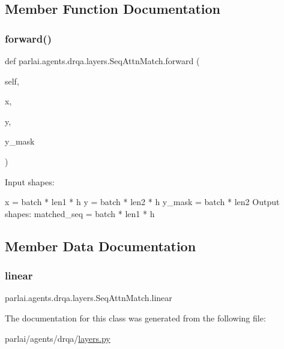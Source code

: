 \subsection{Member Function Documentation}
\mbox{\label{classparlai_1_1agents_1_1drqa_1_1layers_1_1SeqAttnMatch_ade14c6394d52f566a64da6573e8c913b}} 
\subsubsection{\texorpdfstring{forward()}{forward()}}
{\footnotesize\ttfamily def parlai.\+agents.\+drqa.\+layers.\+Seq\+Attn\+Match.\+forward (\begin{DoxyParamCaption}\item[{}]{self,  }\item[{}]{x,  }\item[{}]{y,  }\item[{}]{y\+\_\+mask }\end{DoxyParamCaption})}

\begin{DoxyVerb}Input shapes:

    x = batch * len1 * h
    y = batch * len2 * h
    y_mask = batch * len2
Output shapes:
    matched_seq = batch * len1 * h
\end{DoxyVerb}
 

\subsection{Member Data Documentation}
\mbox{\label{classparlai_1_1agents_1_1drqa_1_1layers_1_1SeqAttnMatch_a6332862a9596fe3e4cb3c323b818a42f}} 
\subsubsection{\texorpdfstring{linear}{linear}}
{\footnotesize\ttfamily parlai.\+agents.\+drqa.\+layers.\+Seq\+Attn\+Match.\+linear}



The documentation for this class was generated from the following file\+:\begin{DoxyCompactItemize}
\item 
parlai/agents/drqa/\hyperlink{layers_8py}{layers.\+py}\end{DoxyCompactItemize}
